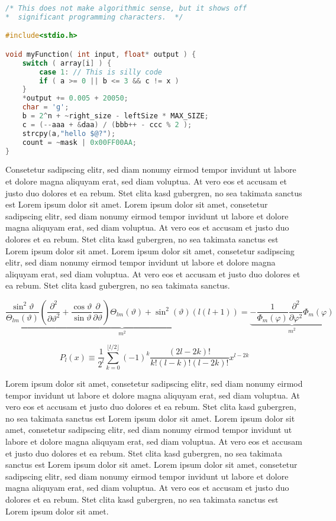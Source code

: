 \documentclass[ %
	DIV=14, %
	BCOR=20mm, %
	parskip=half, %
	headsepline, %
	cleardoublepage=empty, %
	tablecaptionabove, %
	toc=bib, %
	toc=listofnumbered, %
	listof=leveldown, %
	numbers=noendperiod %
	]{scrbook}
\begin{document}
\begin{lstlisting}[language=C, caption=Ein Quellcode-Beispiel]
/* This does not make algorithmic sense, but it shows off
*  significant programming characters.  */

#include<stdio.h>

void myFunction( int input, float* output ) {
	switch ( array[i] ) {
		case 1: // This is silly code
		if ( a >= 0 || b <= 3 && c != x )
	}
	*output += 0.005 + 20050;
	char = 'g';
	b = 2^n + ~right_size - leftSize * MAX_SIZE;
	c = (--aaa + &daa) / (bbb++ - ccc % 2 );
	strcpy(a,"hello $@?");
	count = ~mask | 0x00FF00AA;
}
\end{lstlisting}

Consetetur sadipscing elitr, sed diam nonumy eirmod tempor invidunt ut labore et dolore magna aliquyam erat, sed diam voluptua. At vero eos et accusam et justo duo dolores et ea rebum. Stet clita kasd gubergren, no sea takimata sanctus est Lorem ipsum dolor sit amet. Lorem ipsum dolor sit amet, consetetur sadipscing elitr, sed diam nonumy eirmod tempor invidunt ut labore et dolore magna aliquyam erat, sed diam voluptua. At vero eos et accusam et justo duo dolores et ea rebum. Stet clita kasd gubergren, no sea takimata sanctus est Lorem ipsum dolor sit amet. Lorem ipsum dolor sit amet, consetetur sadipscing elitr, sed diam nonumy eirmod tempor invidunt ut labore et dolore magna aliquyam erat, sed diam voluptua. At vero eos et accusam et justo duo dolores et ea rebum. Stet clita kasd gubergren, no sea takimata sanctus.

\begin{equation}
	\underbrace{\frac{\sin^{2}\vartheta}{\Theta_{lm}(\vartheta)}\left(\frac{\partial^{2}}{\partial\vartheta^{2}}+\frac{\cos\vartheta}{\sin\vartheta}\frac{\partial}{\partial\vartheta}\right)\Theta_{lm}(\vartheta)+\sin^{2}(\vartheta)(l(l+1))}_{m^{2}}=\underbrace{-\frac{1}{\Phi_{m}(\varphi)}\frac{\partial^{2}}{\partial\varphi^{2}}\Phi_{m}(\varphi)}_{m^{2}}
\end{equation}

\begin{equation}
	P_l (x)\equiv\frac {1}{2^l}\sum_{k=0}^{\lfloor l/2\rfloor} (-1)^k \frac{(2l-2k)!}{k!(l-k)!(l-2k)!} x^{l-2k}
\end{equation}

Lorem ipsum dolor sit amet, consetetur sadipscing elitr, sed diam nonumy eirmod tempor invidunt ut labore et dolore magna aliquyam erat, sed diam voluptua. At vero eos et accusam et justo duo dolores et ea rebum. Stet clita kasd gubergren, no sea takimata sanctus est Lorem ipsum dolor sit amet. Lorem ipsum dolor sit amet, consetetur sadipscing elitr, sed diam nonumy eirmod tempor invidunt ut labore et dolore magna aliquyam erat, sed diam voluptua. At vero eos et accusam et justo duo dolores et ea rebum. Stet clita kasd gubergren, no sea takimata sanctus est Lorem ipsum dolor sit amet. Lorem ipsum dolor sit amet, consetetur sadipscing elitr, sed diam nonumy eirmod tempor invidunt ut labore et dolore magna aliquyam erat, sed diam voluptua. At vero eos et accusam et justo duo dolores et ea rebum. Stet clita kasd gubergren, no sea takimata sanctus est Lorem ipsum dolor sit amet.
\end{document}
